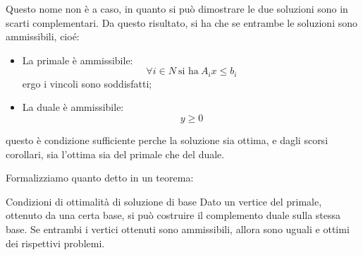 \documentclass[a4paper,11pt]{article}
\begin{document}
Questo nome non è a caso, in quanto si può dimostrare le due soluzioni sono in scarti complementari.
Da questo risultato, si ha che se entrambe le soluzioni sono ammissibili, cioé:
\begin{itemize}
	\item La primale è ammissibile: 
		$$ \forall i \in N \ \text{si ha} \ A_i x \leq b_i $$
		ergo i vincoli sono soddisfatti;
	\item La duale è ammissibile:
		$$ y \geq 0$$
\end{itemize}
questo è condizione sufficiente perche la soluzione sia ottima, e dagli scorsi corollari, sia l'ottima sia del primale che del duale.

Formalizziamo quanto detto in un teorema:
\begin{theorem}{Condizioni di ottimalità di soluzione di base}
	Dato un vertice del primale, ottenuto da una certa base, si può costruire il complemento duale sulla stessa base.
	Se entrambi i vertici ottenuti sono ammissibili, allora sono uguali e ottimi dei rispettivi problemi.
\end{theorem}
\end{document}
